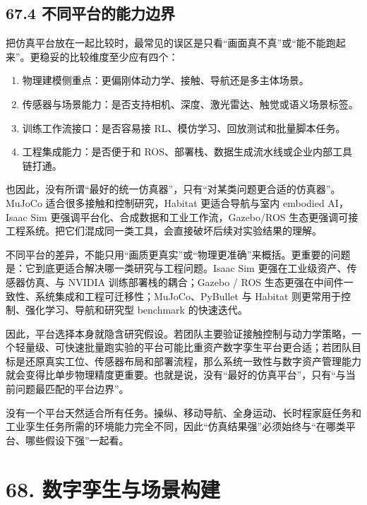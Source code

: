 \section*{67.4 不同平台的能力边界}


把仿真平台放在一起比较时，最常见的误区是只看“画面真不真”或“能不能跑起来”。更稳妥的比较维度至少应有四个：

\begin{enumerate}
\item 物理建模侧重点：更偏刚体动力学、接触、导航还是多主体场景。
\item 传感器与场景能力：是否支持相机、深度、激光雷达、触觉或语义场景标签。
\item 训练工作流接口：是否容易接 RL、模仿学习、回放测试和批量脚本任务。
\item 工程集成能力：是否便于和 ROS、部署栈、数据生成流水线或企业内部工具链打通。
\end{enumerate}

也因此，没有所谓“最好的统一仿真器”，只有“对某类问题更合适的仿真器”。MuJoCo 适合很多接触和控制研究，Habitat 更适合导航与室内 embodied AI，Isaac Sim 更强调平台化、合成数据和工业工作流，Gazebo/ROS 生态更强调可接工程系统。把它们混成同一类工具，会直接破坏后续对实验结果的理解。

不同平台的差异，不能只用“画质更真实”或“物理更准确”来概括。更重要的问题是：它到底更适合解决哪一类研究与工程问题。Isaac Sim 更强在工业级资产、传感器仿真、与 NVIDIA 训练部署栈的耦合；Gazebo / ROS 生态更强在中间件一致性、系统集成和工程可迁移性；MuJoCo、PyBullet 与 Habitat 则更常用于控制、强化学习、导航和研究型 benchmark 的快速迭代。

因此，平台选择本身就隐含研究假设。若团队主要验证接触控制与动力学策略，一个轻量级、可快速批量跑实验的平台可能比重资产数字孪生平台更合适；若团队目标是还原真实工位、传感器布局和部署流程，那么系统一致性与数字资产管理能力就会变得比单步物理精度更重要。也就是说，没有“最好的仿真平台”，只有“与当前问题最匹配的平台边界”。

没有一个平台天然适合所有任务。操纵、移动导航、全身运动、长时程家庭任务和工业孪生任务所需的环境能力完全不同，因此“仿真结果强”必须始终与“在哪类平台、哪些假设下强”一起看。

\chapter*{68. 数字孪生与场景构建}

